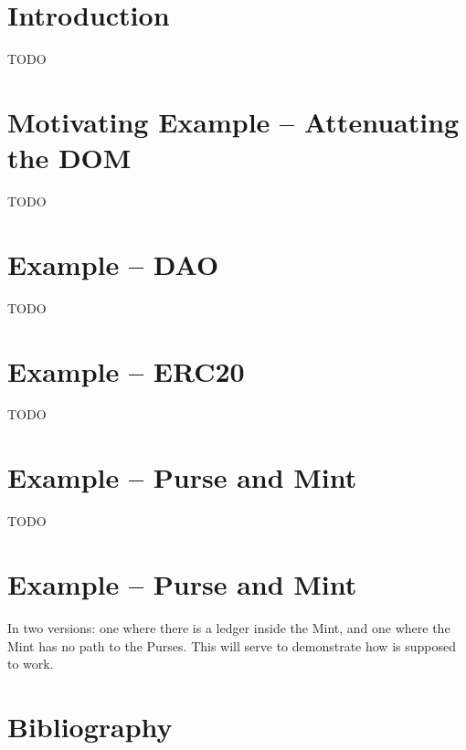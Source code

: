 \documentclass[acmsmall,screen]{acmart}
\begin{document}
\maketitle

\section{Introduction}
TODO

\section{Motivating Example -- Attenuating the DOM}
TODO



\appendix

\section{Example -- DAO}
TODO

\section{Example -- ERC20}
TODO

\section{Example -- Purse and Mint}
TODO

\section{Example -- Purse and Mint}

In two versions: one where there is a ledger inside the Mint, and one where the Mint has no path to the Purses. This will serve to demonstrate how  is supposed to work.


\section*{Bibliography}
 
 
\end{document}
